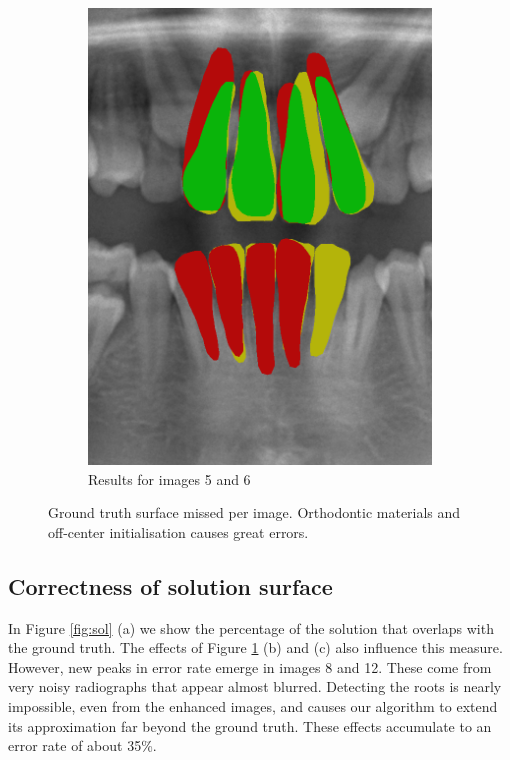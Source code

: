 \documentclass[a4paper,titlepage,12pt]{article}
\begin{document}
\begin{figure}
\begin{subfigure}{0.48\linewidth}
		\includegraphics[width=0.48\columnwidth]{results/6i50}
		\caption{Results for images 5 and 6}
	\end{subfigure}
	\caption{Ground truth surface missed per image. Orthodontic materials and off-center initialisation causes great errors. }
	\label{fig:miss}
\end{figure}

\subsection{Correctness of solution surface}
In Figure \ref{fig:sol} (a) we show the percentage of the solution that overlaps with the ground truth. The effects of Figure \ref{fig:miss} (b) and (c) also influence this measure. However, new peaks in error rate emerge in images 8 and 12. These come from very noisy radiographs that appear almost blurred. Detecting the roots is nearly impossible, even from the enhanced images, and causes our algorithm to extend its approximation far beyond the ground truth. These effects accumulate to an error rate of about 35\%. 
\end{document}
